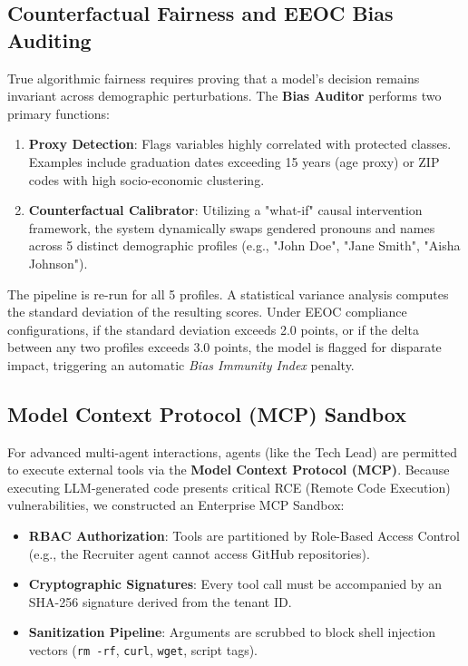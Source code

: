 \subsection{Counterfactual Fairness and EEOC Bias Auditing}
True algorithmic fairness requires proving that a model's decision remains invariant across demographic perturbations. The \textbf{Bias Auditor} performs two primary functions:
\begin{enumerate}
    \item \textbf{Proxy Detection}: Flags variables highly correlated with protected classes. Examples include graduation dates exceeding 15 years (age proxy) or ZIP codes with high socio-economic clustering.
    \item \textbf{Counterfactual Calibrator}: Utilizing a "what-if" causal intervention framework, the system dynamically swaps gendered pronouns and names across 5 distinct demographic profiles (e.g., "John Doe", "Jane Smith", "Aisha Johnson"). 
\end{enumerate}
The pipeline is re-run for all 5 profiles. A statistical variance analysis computes the standard deviation of the resulting scores. Under EEOC compliance configurations, if the standard deviation exceeds 2.0 points, or if the delta between any two profiles exceeds 3.0 points, the model is flagged for disparate impact, triggering an automatic \textit{Bias Immunity Index} penalty.

\subsection{Model Context Protocol (MCP) Sandbox}
For advanced multi-agent interactions, agents (like the Tech Lead) are permitted to execute external tools via the \textbf{Model Context Protocol (MCP)}. Because executing LLM-generated code presents critical RCE (Remote Code Execution) vulnerabilities, we constructed an Enterprise MCP Sandbox:
\begin{itemize}
    \item \textbf{RBAC Authorization}: Tools are partitioned by Role-Based Access Control (e.g., the Recruiter agent cannot access GitHub repositories).
    \item \textbf{Cryptographic Signatures}: Every tool call must be accompanied by an SHA-256 signature derived from the tenant ID.
    \item \textbf{Sanitization Pipeline}: Arguments are scrubbed to block shell injection vectors (\texttt{rm -rf}, \texttt{curl}, \texttt{wget}, script tags).
\end{itemize}

